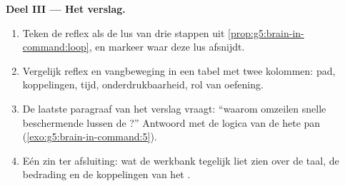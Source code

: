 \begin{problem}
\medskip\noindent\textbf{Deel III --- Het verslag.}
\begin{enumerate}[resume]
  \item Teken de reflex als de lus van drie stappen uit
        \cref{prop:g5:brain-in-command:loop}, en markeer waar deze lus
        afsnijdt.
  \item Vergelijk reflex en vangbeweging in een tabel met twee kolommen:
        pad, koppelingen, tijd, onderdrukbaarheid, rol van oefening.
  \item De laatste paragraaf van het verslag vraagt: ``waarom omzeilen
        snelle beschermende lussen de ?'' Antwoord met de logica
        van de hete pan
        (\cref{exo:g5:brain-in-command:5}).
  \item Eén zin ter afsluiting: wat de werkbank tegelijk liet zien over de
        taal, de bedrading en de koppelingen van het .
\end{enumerate}
\end{problem}
